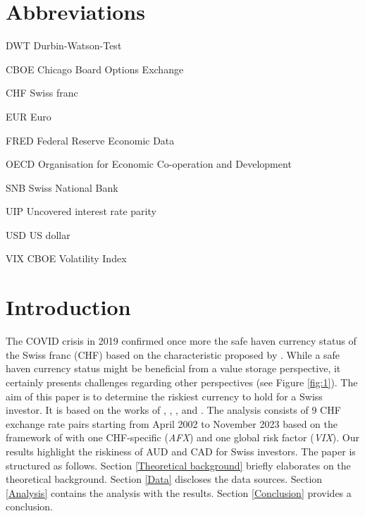 \documentclass[a4paper,11pt,oneside]{article}
\newcommand{\abbrlabel}[1]{\makebox[1in][l]{\textbf{#1}\ }}
\newenvironment{Abbreviations}{\begin{list}{}{\renewcommand{\makelabel}{\abbrlabel}}}{\end{list}}
\begin{document}
\newpage
\pagestyle{plain}
\setcounter{page}{1}
\tableofcontents

\newpage
\pagestyle{plain}
\listoffigures
{}

\begingroup
\vspace{4ex}
\let\clearpage\relax
\listoftables
\endgroup
{}

\newpage
\pagestyle{plain}
\section*{Abbreviations}
\begin{Abbreviations}
\item[DWT] Durbin-Watson-Test 
\item[CBOE] Chicago Board Options Exchange 
\item[CHF] Swiss franc
\item[EUR] Euro
\item[FRED] Federal Reserve Economic Data 
\item[OECD] Organisation for Economic Co-operation and Development
\item[SNB] Swiss National Bank
\item[UIP] Uncovered interest rate parity
\item[USD] US dollar
\item[VIX] CBOE Volatility Index
\end{Abbreviations}


\newpage
\pagestyle{fancy}
\setcounter{page}{1}

\section{Introduction}\label{Introduction}
The COVID crisis in 2019 confirmed once more the safe haven currency status of the Swiss franc (CHF) based on the characteristic proposed by \cite{Habib and Stracca 2012}. While a safe haven currency status might be beneficial from a value storage perspective, it certainly presents challenges regarding other perspectives (see Figure \ref{fig:1}). The aim of this paper is to determine the riskiest currency to hold for a Swiss investor. It is based on the works of \cite{Grisse and Nitschka 2015}, \cite{Verdelhan 2010}, \cite{Backus and Foresi and Telmer 2001}, and \cite{Lustig and Roussanov and Verdelhan 2011}. The analysis consists of 9 CHF exchange rate pairs starting from April 2002 to November 2023 based on the framework of \cite{Grisse and Nitschka 2015} with one CHF-specific (\emph{AFX}) and one global risk factor (\emph{VIX}). Our results highlight the riskiness of AUD and CAD for Swiss investors. The paper is structured as follows. Section \ref{Theoretical background} briefly elaborates on the theoretical background. Section \ref{Data} discloses the data sources. Section \ref{Analysis} contains the analysis with the results. Section \ref{Conclusion} provides a conclusion.\par 
\end{document}
